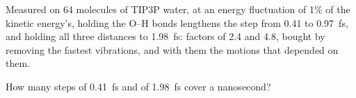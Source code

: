 \begin{keyidea}
Measured on 64 molecules of TIP3P water, at an energy fluctuation of 1\%
of the kinetic energy's, holding the O--H bonds lengthens the step from
0.41 to \SI{0.97}{\femto\second}, and holding all three distances to
\SI{1.98}{\femto\second}: factors of 2.4 and 4.8, bought by removing the
fastest vibrations, and with them the motions that depended on them.
\end{keyidea}


\begin{selfcheck}
How many steps of \SI{0.41}{\femto\second} and of
\SI{1.98}{\femto\second} cover a nanosecond?
\end{selfcheck}
